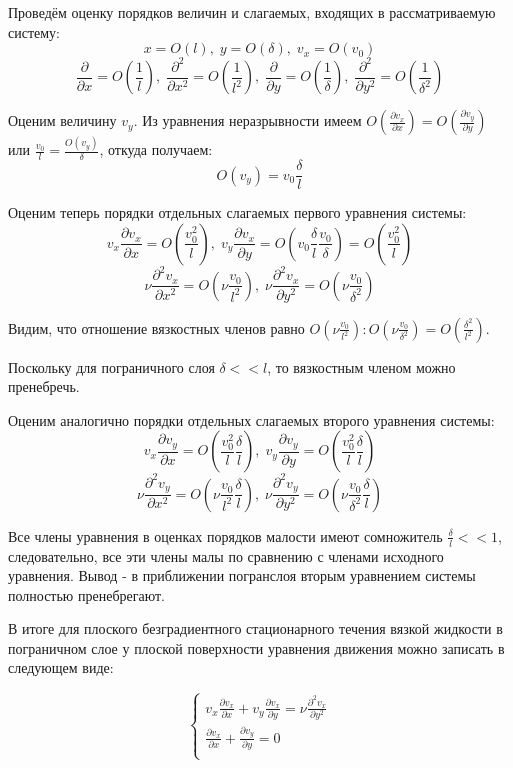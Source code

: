 Проведём оценку порядков величин и слагаемых, входящих в рассматриваемую систему:
$$x = O(l),\; y = O(\delta),\; v_x = O(v_0)$$
$$\frac{\partial}{\partial x} = O(\frac{1}{l}),\; \frac{\partial^2}{\partial x^2} = O(\frac{1}{l^2}),\; \frac{\partial}{\partial y} = O(\frac{1}{\delta}),\; \frac{\partial^2}{\partial y^2} = O(\frac{1}{\delta^2})$$

Оценим величину $v_y$. Из уравнения неразрывности имеем $O(\frac{\partial v_x}{\partial x}) = O(\frac{\partial v_y}{\partial y})$ или $\frac{v_0}{l} = \frac{O(v_y)}{\delta}$, откуда получаем:
$$O(v_y) = v_0\frac{\delta}{l}$$

Оценим теперь порядки отдельных слагаемых первого уравнения системы:
$$v_x\frac{\partial v_x}{\partial x} = O(\frac{v_0^2}{l}),\; v_y\frac{\partial v_x}{\partial y} = O(v_0\frac{\delta}{l} \frac{v_0}{\delta}) = O(\frac{v_0^2}{l})$$
$$\nu \frac{\partial^2 v_x}{\partial x^2} = O(\nu \frac{v_0}{l^2}),\; \nu \frac{\partial^2 v_x}{\partial y^2} = O(\nu \frac{v_0}{\delta^2})$$

Видим, что отношение вязкостных членов равно $O(\nu \frac{v_0}{l^2}) : O(\nu \frac{v_0}{\delta^2}) = O(\frac{\delta^2}{l^2})$.

Поскольку для пограничного слоя $\delta << l$, то вязкостным членом можно пренебречь.

\bigskip
Оценим аналогично порядки отдельных слагаемых второго уравнения системы: 
$$v_x\frac{\partial v_y}{\partial x} = O(\frac{v_0^2}{l}\frac{\delta}{l}),\; v_y\frac{\partial v_y}{\partial y} = O(\frac{v_0^2}{l}\frac{\delta}{l})$$
$$\nu \frac{\partial^2 v_y}{\partial x^2} = O(\nu \frac{v_0}{l^2}\frac{\delta}{l}),\; \nu \frac{\partial^2 v_y}{\partial y^2} = O(\nu \frac{v_0}{\delta^2}\frac{\delta}{l})$$

Все члены уравнения в оценках порядков малости имеют сомножитель $\frac{\delta}{l} << 1$, следовательно, все эти члены малы по
сравнению с членами исходного уравнения. Вывод - в приближении погранслоя вторым уравнением системы полностью пренебрегают.

В итоге для плоского безградиентного стационарного течения вязкой жидкости в пограничном слое у плоской поверхности уравнения движения можно записать в следующем виде:

\begin{equation}
    \begin{cases}
        v_x\frac{\partial v_x}{\partial x} + v_y\frac{\partial v_x}{\partial y} = \nu \frac{\partial^2 v_x}{\partial y^2}\\

        \frac{\partial v_x}{\partial x} + \frac{\partial v_y}{\partial y} = 0\\
    \end{cases}
\end{equation}